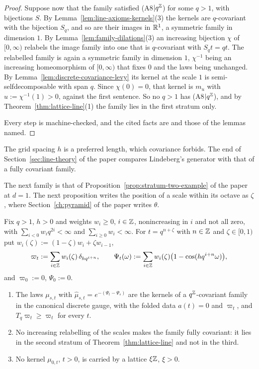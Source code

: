 \begin{proof}
Suppose now that the family satisfied (A8$|q^{\mathbb{Z}}$) for some $q > 1$, with bijections $S$. By
Lemma~\ref{lem:line-axioms-kernels}(3) the kernels are $q$-covariant with the bijection $S_q$, and
so are their images in $\mathbb{R}^1$, a symmetric family in dimension $1$. By
Lemma~\ref{lem:family-dilations}(3) an increasing bijection $\chi$ of $[0,\infty)$ relabels the
image family into one that is $q$-covariant with $S_qt = qt$. The relabelled family is again a
symmetric family in dimension $1$, $\chi^{-1}$ being an increasing homeomorphism of $[0,\infty)$
that fixes $0$ and the laws being unchanged. By
Lemma~\ref{lem:discrete-covariance-levy} its kernel at the scale $1$ is semi-selfdecomposable with
span $q$. Since $\chi(0) = 0$, that kernel is $m_u$ with $u := \chi^{-1}(1) > 0$, against the first
sentence. So no $q > 1$ has (A8$|q^{\mathbb{Z}}$), and by Theorem~\ref{thm:lattice-line}(1) the family lies
in the first stratum only.

Every step is machine-checked, and the cited facts are  and those of the lemmas named.
\end{proof}

The grid spacing $h$ is a preferred length, which covariance forbids. The end of
Section~\ref{sec:line-theory} of the paper compares Lindeberg's generator with that of a fully
covariant family.

The next family is that of Proposition~\ref{prop:stratum-two-example} of the paper at $d = 1$. The
next proposition writes the position of a scale within its octave as $\zeta$, where
Section~\ref{ch:pyramid} of the paper writes $\theta$.

\begin{proposition}
\label{prop:discrete-gaussian-pyramid}

Fix $q > 1$, $h > 0$ and weights $w_i \ge 0$, $i \in \mathbb{Z}$, nonincreasing in $i$ and not all zero,
with $\sum_{i < 0}w_iq^{2i} < \infty$ and $\sum_{i \ge 0}w_i < \infty$. For $t = q^{n+\zeta}$
with $n \in \mathbb{Z}$ and $\zeta \in [0,1)$ put $w_i(\zeta) := (1-\zeta)w_i + \zeta w_{i-1}$,
\[
  \varpi_t := \sum_{i \in \mathbb{Z}}w_i(\zeta)\,\delta_{hq^{i+n}}, \qquad
  \Psi_t(\omega) := \sum_{i \in \mathbb{Z}}w_i(\zeta)\bigl(1 - \cos(hq^{i+n}\omega)\bigr),
\]
and $\varpi_0 := 0$, $\Psi_0 := 0$.
\begin{enumerate}
\item The laws $\mu_{s,t}$ with $\widehat\mu_{s,t} = e^{-(\Psi_t - \Psi_s)}$ are the kernels of a
$q^{\mathbb{Z}}$-covariant family in the canonical discrete gauge, with the folded data $a(t) = 0$ and
$\varpi_t$, and $T_q\varpi_t \ge \varpi_t$ for every $t$.
\item No increasing relabelling of the scales makes the family fully covariant: it lies in the
second stratum of Theorem~\ref{thm:lattice-line} and not in the third.
\item No kernel $\mu_{0,t}$, $t > 0$, is carried by a lattice $\xi\mathbb{Z}$, $\xi > 0$.
\end{enumerate}
\end{proposition}

